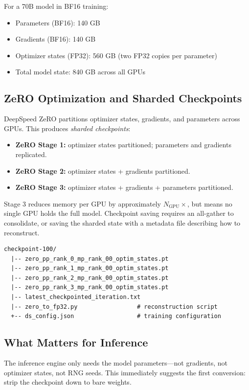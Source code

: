 \documentclass[11pt,a4paper]{article}
\theoremstyle{definition}
\begin{document}
For a 70B model in BF16 training:
\begin{itemize}
	\item Parameters (BF16): 140 GB
	\item Gradients (BF16): 140 GB
	\item Optimizer states (FP32): 560 GB (two FP32 copies per parameter)
	\item Total model state: 840 GB across all GPUs
\end{itemize}

\subsection{ZeRO Optimization and Sharded Checkpoints}

DeepSpeed ZeRO partitions optimizer states, gradients, and parameters across GPUs. This produces \emph{sharded checkpoints}:

\begin{itemize}
	\item \textbf{ZeRO Stage 1:} optimizer states partitioned; parameters and gradients replicated.
	\item \textbf{ZeRO Stage 2:} optimizer states + gradients partitioned.
	\item \textbf{ZeRO Stage 3:} optimizer states + gradients + parameters partitioned.
\end{itemize}

Stage 3 reduces memory per GPU by approximately $N_{\text{GPU}}\times$, but means no single GPU holds the full model. Checkpoint saving requires an all-gather to consolidate, or saving the sharded state with a metadata file describing how to reconstruct.

\begin{lstlisting}[caption=ZeRO checkpoint directory structure]
  checkpoint-100/
  |-- zero_pp_rank_0_mp_rank_00_optim_states.pt
  |-- zero_pp_rank_1_mp_rank_00_optim_states.pt
  |-- zero_pp_rank_2_mp_rank_00_optim_states.pt
  |-- zero_pp_rank_3_mp_rank_00_optim_states.pt
  |-- latest_checkpointed_iteration.txt
  |-- zero_to_fp32.py                 # reconstruction script
  +-- ds_config.json                  # training configuration
\end{lstlisting}

\subsection{What Matters for Inference}

The inference engine only needs the model parameters---not gradients, not optimizer states, not RNG seeds. This immediately suggests the first conversion: strip the checkpoint down to bare weights.
\end{document}
